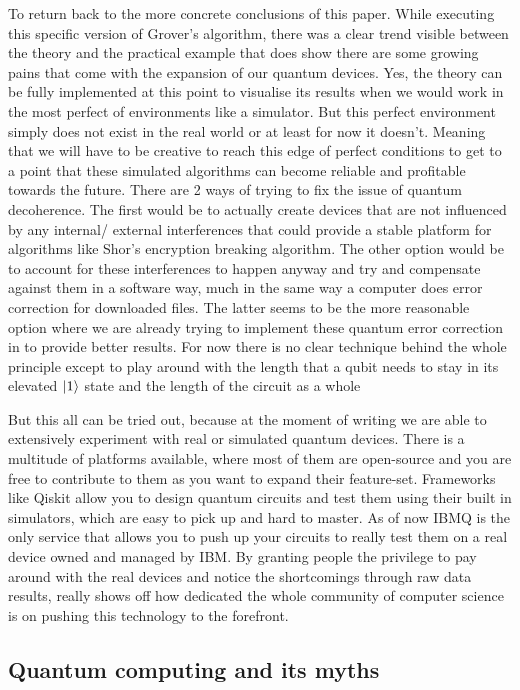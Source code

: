 To return back to the more concrete conclusions of this paper. While executing this specific version of Grover's algorithm, there was a clear trend visible between the theory and the practical example that does show there are some growing pains that come with the expansion of our quantum devices.
Yes, the theory can be fully implemented at this point to visualise its results when we would work in the most perfect of environments like a simulator. But this perfect environment simply does not exist in the real world or at least for now it doesn't. Meaning that we will have to be creative to reach this edge of perfect conditions to get to a point that these simulated algorithms can become reliable and profitable towards the future. There are 2 ways of trying to fix the issue of quantum decoherence. The first would be to actually create devices that are not influenced by any internal/ external interferences that could provide a stable platform for algorithms like Shor's encryption breaking algorithm. The other option would be to account for these interferences to happen anyway and try and compensate against them in a software way, much in the same way a computer does error correction for downloaded files. The latter seems to be the more reasonable option where we are already trying to implement these quantum error correction in to provide better results. For now there is no clear technique behind the whole principle except to play around with the length that a qubit needs to stay in its elevated $\ket{1}$ state and the length of the circuit as a whole

But this all can be tried out, because at the moment of writing we are able to extensively experiment with real or simulated quantum devices. There is a multitude of platforms available, where most of them are open-source and you are free to contribute to them as you want to expand their feature-set. Frameworks like Qiskit allow you to design quantum circuits and test them using their built in simulators, which are easy to pick up and hard to master. As of now IBMQ is the only service that allows you to push up your circuits to really test them on a real device owned and managed by IBM. By granting people the privilege to pay around with the real devices and notice the shortcomings through raw data results, really shows off how dedicated the whole community of computer science is on pushing this technology to the forefront.


\subsection{Quantum computing and its myths}

